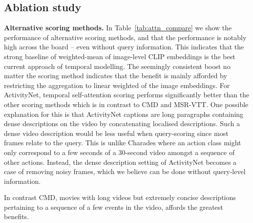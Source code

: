 \subsection{Ablation study}
\label{subsec:ablation}

\noindent\textbf{Alternative scoring methods.}
In Table~\ref{tab:attn_compare} we show the performance of alternative scoring methods, and that the performance is notably high across the board -- even without query information. This indicates that the strong baseline of weighted-mean of image-level CLIP embeddings is the best current approach of temporal modelling. The seemingly consistent boost no matter the scoring method indicates that the benefit is mainly afforded by restricting the aggregation  to linear weighted of the image embeddings. For ActivityNet, temporal self-attention scoring performs significantly better than the other scoring methods which is in contrast to CMD and MSR-VTT. One possible explanation for this is that ActivityNet captions are long paragraphs containing dense descriptions on the video by concatenating localised descriptions. Such a dense video description would be less useful when query-scoring since most frames relate to the query. This is unlike Charades where an action class might only correspond to a few seconds of a 30-second video amongst a sequence of other actions. Instead, the dense description setting of ActivityNet becomes a case of removing noisy frames, which we believe can be done without query-level information.

In contrast CMD, movies with long videos but extremely concise descriptions pertaining to a sequence of a few events in the video, affords the greatest benefits.

